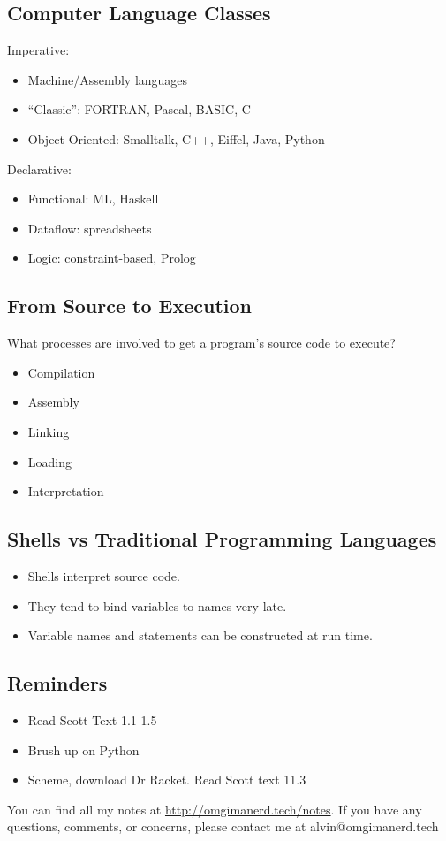 \documentclass{math}
\begin{document}
\subsection*{Computer Language Classes}
Imperative:
\begin{itemize}
  \item Machine/Assembly languages
  \item ``Classic'': FORTRAN, Pascal, BASIC, C
  \item Object Oriented: Smalltalk, C++, Eiffel, Java, Python
\end{itemize}
Declarative:
\begin{itemize}
  \item Functional: ML, Haskell
  \item Dataflow: spreadsheets
  \item Logic: constraint-based, Prolog
\end{itemize}

\subsection*{From Source to Execution}
What processes are involved to get a program's source code to execute?
\begin{itemize}
  \item Compilation
  \item Assembly
  \item Linking
  \item Loading
  \item Interpretation
\end{itemize}

\subsection*{Shells vs Traditional Programming Languages}
\begin{itemize}
  \item Shells interpret source code.
  \item They tend to bind variables to names very late.
  \item Variable names and statements can be constructed at run time.
\end{itemize}

\subsection*{Reminders}
\begin{itemize}
  \item Read Scott Text 1.1-1.5
  \item Brush up on Python
  \item Scheme, download Dr Racket. Read Scott text 11.3
\end{itemize}

\begin{center}
  You can find all my notes at \url{http://omgimanerd.tech/notes}. If you have
  any questions, comments, or concerns, please contact me at
  alvin@omgimanerd.tech
\end{center}
\end{document}
